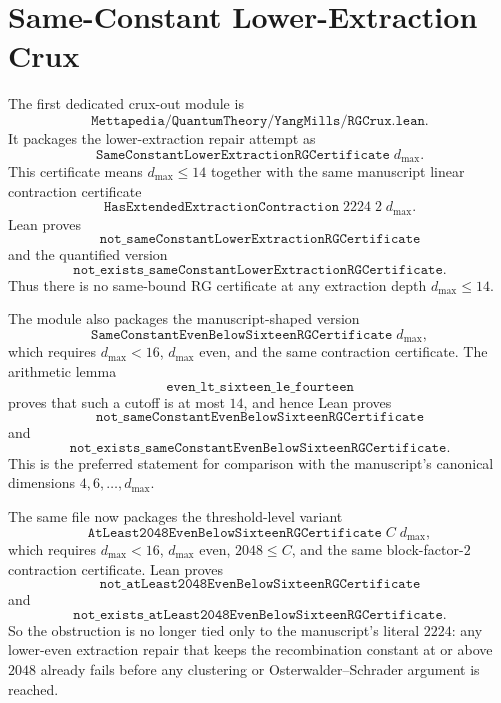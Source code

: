 \documentclass[11pt]{article}
\newcommand{\lean}[1]{\texttt{#1}}
\begin{document}
\section{Same-Constant Lower-Extraction Crux}

The first dedicated crux-out module is
\[
  \lean{Mettapedia/QuantumTheory/YangMills/RGCrux.lean}.
\]
It packages the lower-extraction repair attempt as
\[
  \lean{SameConstantLowerExtractionRGCertificate}\;d_{\max}.
\]
This certificate means \(d_{\max}\le 14\) together with the same manuscript
linear contraction certificate
\[
  \lean{HasExtendedExtractionContraction}\;2224\;2\;d_{\max}.
\]
Lean proves
\[
  \lean{not\_sameConstantLowerExtractionRGCertificate}
\]
and the quantified version
\[
  \lean{not\_exists\_sameConstantLowerExtractionRGCertificate}.
\]
Thus there is no same-bound RG certificate at any extraction depth
\(d_{\max}\le 14\).

The module also packages the manuscript-shaped version
\[
  \lean{SameConstantEvenBelowSixteenRGCertificate}\;d_{\max},
\]
which requires \(d_{\max}<16\), \(d_{\max}\) even, and the same contraction
certificate.  The arithmetic lemma
\[
  \lean{even\_lt\_sixteen\_le\_fourteen}
\]
proves that such a cutoff is at most \(14\), and hence Lean proves
\[
  \lean{not\_sameConstantEvenBelowSixteenRGCertificate}
\]
and
\[
  \lean{not\_exists\_sameConstantEvenBelowSixteenRGCertificate}.
\]
This is the preferred statement for comparison with the manuscript's canonical
dimensions \(4,6,\ldots,d_{\max}\).

The same file now packages the threshold-level variant
\[
  \lean{AtLeast2048EvenBelowSixteenRGCertificate}\;C\;d_{\max},
\]
which requires \(d_{\max}<16\), \(d_{\max}\) even, \(2048\le C\), and the
same block-factor-\(2\) contraction certificate.  Lean proves
\[
  \lean{not\_atLeast2048EvenBelowSixteenRGCertificate}
\]
and
\[
  \lean{not\_exists\_atLeast2048EvenBelowSixteenRGCertificate}.
\]
So the obstruction is no longer tied only to the manuscript's literal
\(2224\): any lower-even extraction repair that keeps the recombination
constant at or above \(2048\) already fails before any clustering or
Osterwalder--Schrader argument is reached.
\end{document}
